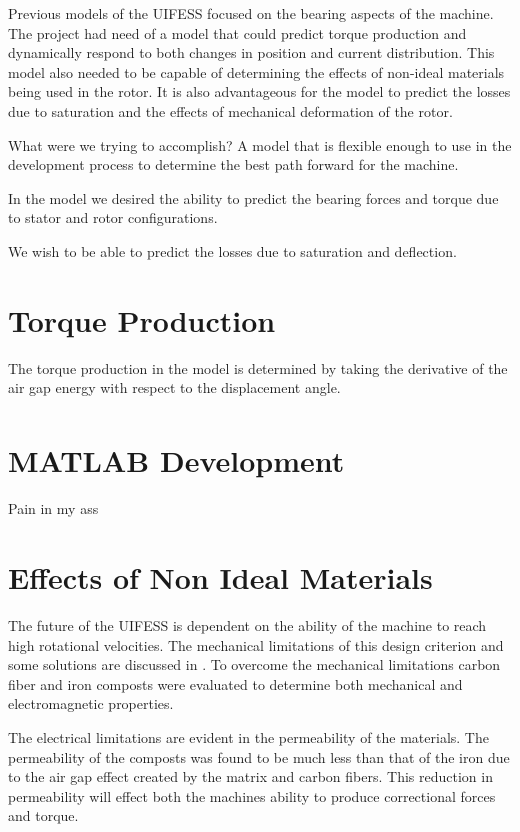 \onehalfspacing

Previous models of the UIFESS focused on the bearing aspects of the machine. The project had need of a model that could predict torque production and dynamically respond to both changes in position and current distribution. This model also needed to be capable of determining the effects of non-ideal materials being used in the rotor. It is also advantageous for the model to predict the losses due to saturation and the effects of mechanical deformation of the rotor.


What were we trying to accomplish?
	A model that is flexible enough to use in the development process to determine the best path forward for the machine. 
	
	In the model we desired the ability to predict the bearing forces and torque due to stator and rotor configurations.
	
	We wish to be able to predict the losses due to saturation and deflection.
	
	

\section{Torque Production}
The torque production in the model is determined by taking the derivative of the air gap energy with respect to the displacement angle.

\section{MATLAB\textsuperscript{\textregistered} Development}
Pain in my ass

\section{Effects of Non Ideal Materials}
The future of the UIFESS is dependent on the ability of the machine to reach high rotational velocities. The mechanical limitations of this design criterion and some solutions are discussed in \cite{Pettingill}.  To overcome the mechanical limitations carbon fiber and iron composts were evaluated to determine both mechanical and electromagnetic properties.

The electrical limitations are evident in the permeability of the materials. The permeability of the composts was found to be much less than that of the iron due to the air gap effect created by the matrix and carbon fibers. This reduction in permeability will effect both the machines ability to produce correctional forces and torque.

